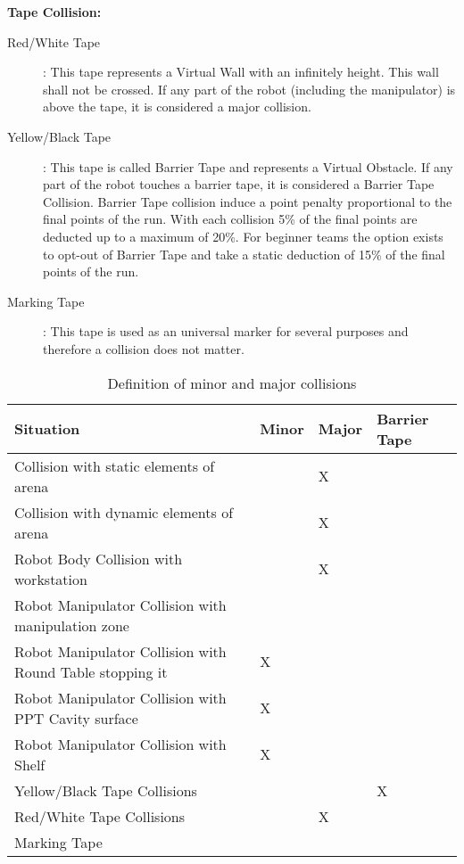 \textbf{Tape Collision:}

\begin{description}
  \item[Red/White Tape]: This tape represents a Virtual Wall with an infinitely height. This wall shall not be crossed. If any part of the robot (including the manipulator) is above the tape, it is considered a major collision. 
  \item[Yellow/Black Tape]: This tape is called Barrier Tape and represents a Virtual Obstacle. If any part of the robot
  touches a barrier tape, it is considered a Barrier Tape Collision. Barrier Tape collision induce a point penalty
  proportional to the final points of the run. With each collision 5\% of the final points are deducted up to a maximum
  of 20\%. For beginner teams the option exists to opt-out of Barrier Tape and take a static deduction of 15\% of the
  final points of the run.
  \item[Marking Tape]: This tape is used as an universal marker for several purposes and therefore a collision does not matter. 
\end{description}

\begin{table}[h!]
	\caption{Definition of minor and major collisions}
	\label{tab:collisions}
	\centering
  \begin{tabular}{|l|p{1cm}|p{1cm}|p{1.5cm}|}
		\hline
		Situation                                                & Minor & Major & Barrier Tape \\
    \hline
    Collision with static elements of arena                  &       & X     &              \\
    Collision with dynamic elements of arena                 &       & X     &              \\
    Robot Body Collision with workstation                    &       & X     &              \\
    Robot Manipulator Collision with manipulation zone       &       &       &              \\
    Robot Manipulator Collision with Round Table stopping it & X     &       &              \\
    Robot Manipulator Collision with PPT Cavity surface      & X     &       &              \\
    Robot Manipulator Collision with Shelf                   & X     &       &              \\
		Yellow/Black Tape Collisions                             &       &       & X            \\
    Red/White Tape Collisions                                &       & X     &              \\
    Marking Tape & & & \\
    \hline
	\end{tabular}
\end{table}

